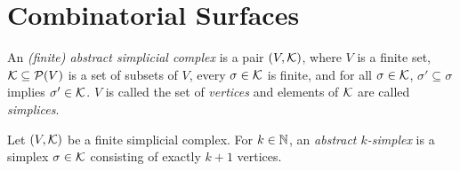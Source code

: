 \chapter{Combinatorial Surfaces}
\label{chap:combo_surfaces}



\begin{definition}
  \label{def:fin_abstr_simpl_complex}
  \leanok
  An \emph{(finite) abstract simplicial complex} is a pair $(V,\mathcal{K})$, 
  where $V$ is a finite set, 
  $\mathcal{K} \subseteq \mathcal{P}(V)$ is a set of subsets of $V$, 
  every $\sigma \in \mathcal{K}$ is finite, 
  and for all $\sigma \in \mathcal{K}$, 
  $\sigma' \subseteq \sigma$ implies $\sigma' \in \mathcal{K}$. 
  $V$ is called the set of \emph{vertices} 
  and elements of $\mathcal{K}$ are called \emph{simplices}.
\end{definition}

\begin{definition}
  \label{def:fin_abstr_simplex}
  \leanok
  Let $(V,\mathcal{K})$ be a finite simplicial complex. 
  For $k \in \mathbb{N}$, an \emph{abstract $k$-simplex} is 
  a simplex $\sigma \in \mathcal{K}$ consisting of exactly $k+1$ vertices.
\end{definition}
